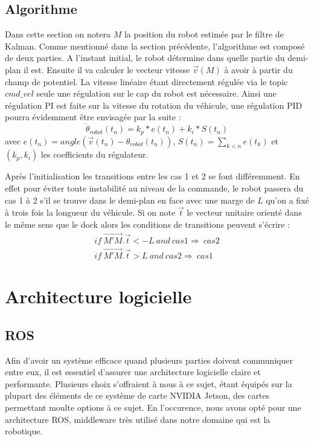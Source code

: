 \documentclass[12pt]{report}
\begin{document}
\section{Algorithme}

Dans cette section on notera $M$ la position du robot estimée par le filtre de Kalman. Comme mentionné dans la section précédente, l'algorithme est composé de deux parties. A l'instant initial, le robot détermine dans quelle partie du demi-plan il est. Ensuite il va calculer le vecteur vitesse $\overrightarrow{v}(M)$ à avoir à partir du champ de potentiel. La vitesse linéaire étant directement régulée via le topic $cmd\_vel$ seule une régulation sur le cap du robot est nécessaire. Ainsi une régulation PI est faite sur la vitesse du rotation du véhicule, une régulation PID pourra évidemment être envisagée par la suite : 
\[\dot{\theta}_{robot}(t_n)=k_p*e(t_n)+k_i*S(t_n)\]
avec $e(t_n)=angle(\overrightarrow{v}(t_n)-\theta_{robot}(t_n))$, $S(t_n) = \sum_{k<n}{e(t_k)}$ et $(k_p,k_i)$ les coefficients du régulateur. 

Après l'initialisation les transitions entre les cas 1 et 2 se font différemment. En effet pour éviter toute instabilité au niveau de la commande, le robot passera du cas 1 à 2 s'il se trouve dans le demi-plan en face avec une marge de $L$ qu'on a fixé à trois fois la longueur du véhicule. Si on note $\overrightarrow{t}$ le vecteur unitaire orienté dans le même sens que le dock alors les conditions de transitions peuvent s'écrire : 
\begin{eqnarray}
    if \ \overrightarrow{M'M} . \overrightarrow{t}<-L \ and \ cas 1 \Rightarrow  \ cas 2 \\ 
    if \ \overrightarrow{M'M} . \overrightarrow{t}>L \ and \ cas 2 \Rightarrow  \ cas 1
\end{eqnarray}

\chapter{Architecture logicielle}
\section{ROS}
Afin d'avoir un système efficace quand plusieurs parties doivent communiquer entre eux, il est essentiel
d'assurer une architecture logicielle claire et performante. Plusieurs choix s'offraient à nous à ce sujet,
étant équipés sur la plupart des éléments de ce système de carte NVIDIA Jetson, des cartes permettant moulte
options à ce sujet. En l'occurence, nous avons opté pour une architecture ROS, middleware très utilisé
dans notre domaine qui est la robotique.
\end{document}
